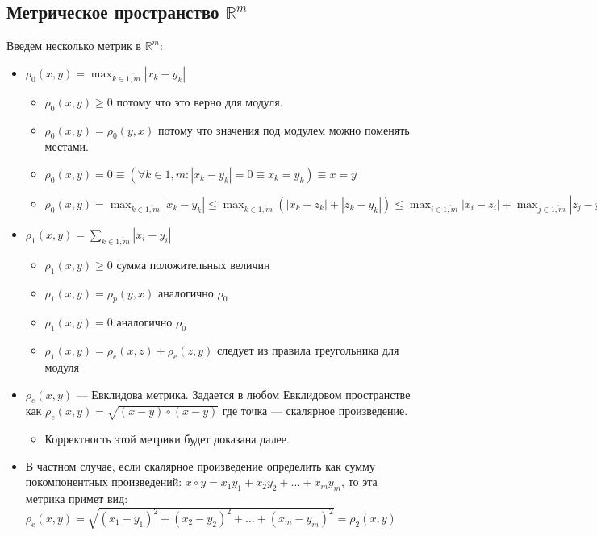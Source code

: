 \subsection{Метрическое пространство $\mathbb{R}^m$}
Введем несколько метрик в $\mathbb{R}^m$:
\begin{itemize}
    \item $\rho_0(x, y) = \max_{k \in \overline{1, m}} |x_k - y_k|$
    \begin{itemize}
        \item $\rho_0(x, y) \geq 0$ потому что это верно для модуля.
        \item $\rho_0(x,y) = \rho_0(y, x)$ потому что значения под модулем можно поменять местами.
        \item $\rho_0(x, y) = 0 \equiv
        (\forall k \in \overline{1, m} : |x_k - y_k| = 0 \equiv x_k = y_k)
        \equiv x = y$
        \item $\rho_0(x, y) = 
        \max_{k \in \overline{1, m}} |x_k - y_k| \leq
        \max_{k \in \overline{1, m}}
        (|x_k - z_k| + |z_k - y_k|) \leq
        \max_{i \in \overline{1, m}} |x_i - z_i| + 
        \max_{j \in \overline{1, m}} |z_j - y_j| =
        \rho_0(x, z) + \rho_0(z, y)$
    \end{itemize}
    \item $\rho_1(x, y) = \sum_{k \in \overline{1, m}} |x_i - y_i|$
    \begin{itemize}
        \item $\rho_1(x, y) \geq 0$ сумма положительных величин
        \item $\rho_1(x,y) = \rho_p(y, x)$ аналогично $\rho_0$
        \item $\rho_1(x, y) = 0$ аналогично $\rho_0$
        \item $\rho_1(x, y) = \rho_e(x, z) + \rho_e(z, y)$ следует из правила треугольника для модуля
    \end{itemize}
    \item $\rho_e(x, y)$ --- Евклидова метрика. Задается в любом Евклидовом пространстве как $\rho_e(x, y) = \sqrt{(x-y) \circ (x-y)}$ где точка --- скалярное произведение.
    \begin{itemize}
        \item Корректность этой метрики будет доказана далее.
    \end{itemize}
    \item В частном случае, если скалярное произведение определить как сумму покомпонентных произведений: $x \circ y = x_1y_1 + x_2y_2 + \dots + x_my_m$, то эта метрика примет вид: $\rho_e(x, y) = \sqrt{(x_1 - y_1)^2 + (x_2 - y_2)^2 + \dots + (x_m - y_m)^2} = \rho_2(x, y)$
\end{itemize}
